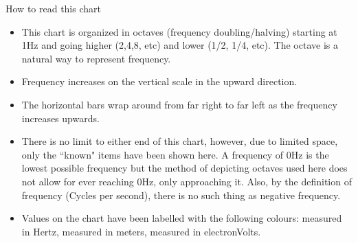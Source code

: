 {
{\Large How to read this chart}
\begin{itemize}

\item This chart is organized in octaves (frequency doubling/halving) starting at 1Hz and going higher (2,4,8, etc) and lower (1/2, 1/4, etc). The octave is a natural way to represent frequency.

\item Frequency increases on the vertical scale in the upward direction.

\item The horizontal bars wrap around from far right to far left as the frequency increases upwards.


\item There is no limit to either end of this chart, however, due to limited space, only the ``known" items have been shown here. A frequency of 0Hz is the lowest possible frequency but the method of depicting octaves used here does not allow for ever reaching 0Hz, only approaching it. Also, by the definition of frequency (Cycles per second), there is no such thing as negative frequency.

\item Values on the chart have been labelled with the following colours: \psframebox[framesep=1pt,fillstyle=solid,fillcolor=Black]{\textcolor{FColor}{Frequency}}  measured in Hertz, \psframebox[framesep=1pt,fillstyle=solid,fillcolor=Black]{\textcolor{WColor}{Wavelength}} measured in meters, \psframebox[framesep=1pt,fillstyle=solid,fillcolor=Black]{\textcolor{EColor}{Energy}} measured in electronVolts.

\end{itemize}
}
